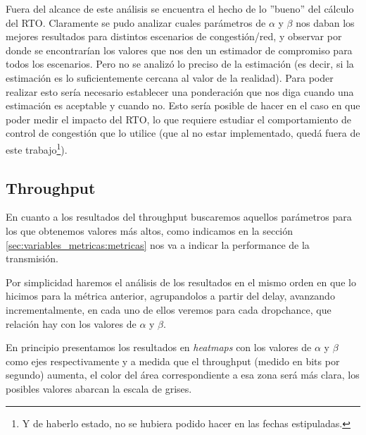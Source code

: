 \par Fuera del alcance de este an\'alisis se encuentra el hecho de lo ''bueno''
del c\'alculo del RTO. Claramente se pudo analizar cuales par\'ametros de
$\alpha$ y $\beta$ nos daban los mejores resultados para distintos escenarios de
congesti\'on/red, y observar por donde se encontrar\'ian los valores que nos den
un estimador de compromiso para todos los escenarios. Pero no se analiz\'o lo
preciso de la estimaci\'on (es decir, si la estimaci\'on es lo suficientemente
cercana al valor de la realidad). Para poder realizar esto ser\'ia necesario
establecer una ponderaci\'on que nos diga cuando una estimaci\'on es aceptable y
cuando no. Esto ser\'ia posible de hacer en el caso en que poder medir el
impacto del RTO, lo que requiere estudiar el comportamiento de control de
congesti\'on que lo utilice (que al no estar implementado, qued\'a fuera de este
trabajo\footnote{Y de haberlo estado, no se hubiera podido hacer en las fechas
estipuladas.}).

\FloatBarrier

\clearpage
\subsection{Throughput}\label{sec:resultados:throughput}

\par En cuanto a los resultados del throughput buscaremos aquellos par\'ametros
para los que obtenemos valores m\'as altos, como indicamos en la secci\'on
\ref{sec:variables_metricas:metricas} nos va a indicar la performance de la
transmisi\'on.

\par Por simplicidad haremos el an\'alisis de los resultados en el mismo orden
en que lo hicimos para la m\'etrica anterior, agrupandolos a partir del delay,
avanzando incrementalmente, en cada uno de ellos veremos para cada dropchance,
que relaci\'on hay con los valores de $\alpha$ y $\beta$.

\par En principio presentamos los resultados en \emph{heatmaps} con los valores
de $\alpha$ y $\beta$ como ejes respectivamente y a medida que el throughput
(medido en bits por segundo) aumenta, el color del \'area correspondiente a esa
zona ser\'a m\'as clara, los posibles valores abarcan la escala de grises.

